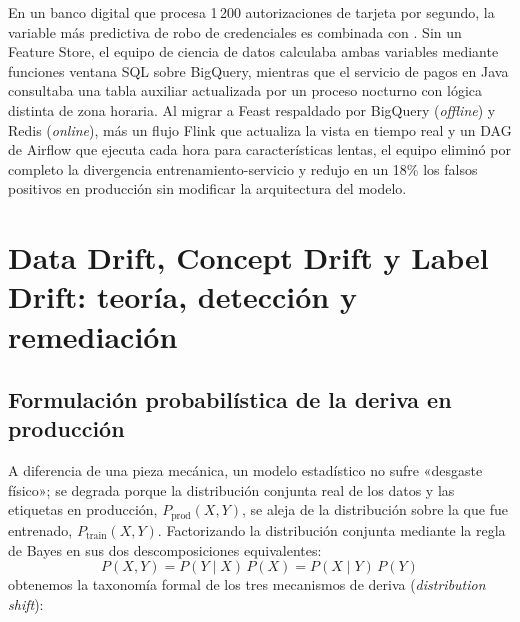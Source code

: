 \begin{examplebox}
En un banco digital que procesa 1\,200 autorizaciones de tarjeta por segundo, la variable más predictiva de robo de credenciales es  combinada con . Sin un Feature Store, el equipo de ciencia de datos calculaba ambas variables mediante funciones ventana SQL sobre BigQuery, mientras que el servicio de pagos en Java consultaba una tabla auxiliar actualizada por un proceso nocturno con lógica distinta de zona horaria. Al migrar a Feast respaldado por BigQuery (\textit{offline}) y Redis (\textit{online}), más un flujo Flink que actualiza la vista en tiempo real y un DAG de Airflow que ejecuta  cada hora para características lentas, el equipo eliminó por completo la divergencia entrenamiento-servicio y redujo en un 18\% los falsos positivos en producción sin modificar la arquitectura del modelo.
\end{examplebox}

\section[Data, Concept y Label Drift]{Data Drift, Concept Drift y Label Drift: teoría, detección y remediación}\label{sec:mlops-drift}

\subsection{Formulación probabilística de la deriva en producción}

A diferencia de una pieza mecánica, un modelo estadístico no sufre «desgaste físico»; se degrada porque la distribución conjunta real de los datos y las etiquetas en producción, $P_{\text{prod}}(X, Y)$, se aleja de la distribución sobre la que fue entrenado, $P_{\text{train}}(X, Y)$. Factorizando la distribución conjunta mediante la regla de Bayes en sus dos descomposiciones equivalentes:
\[
P(X, Y) = P(Y \mid X)\, P(X) = P(X \mid Y)\, P(Y)
\]
obtenemos la taxonomía formal de los tres mecanismos de deriva (\textit{distribution shift}):


